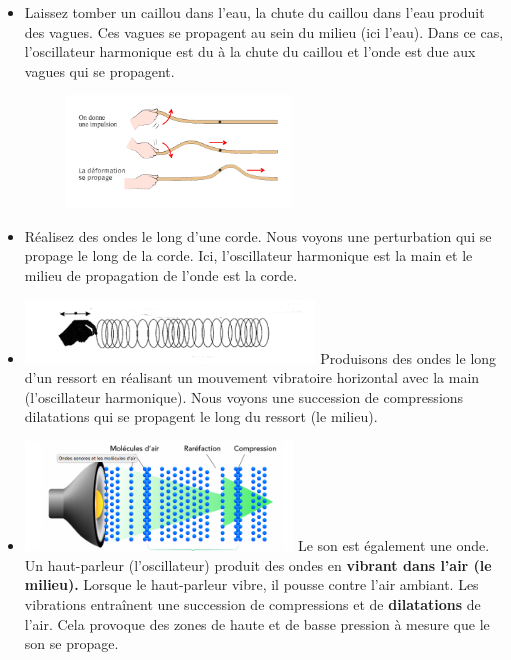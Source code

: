 \begin{multicols}{2}
\begin{itemize}
\item  Laissez tomber un caillou dans l'eau, la chute du caillou dans l'eau
  produit des vagues. Ces vagues se propagent au sein du milieu (ici
  l'eau). Dans ce cas, l'oscillateur harmonique est du à la chute du
  caillou et l'onde est due aux vagues qui se propagent.
   \begin{figure}
   \centering
   \includegraphics[width=6.01cm,height=2.988cm]{Pictures/1000000100000154000000A9940E61F701C2806C.png}
   \caption{}
   \end{figure}
\item   Réalisez des ondes le long d'une corde. Nous voyons une perturbation
  qui se propage le long de la corde. Ici, l'oscillateur harmonique est
  la main et le milieu de propagation de l'onde est la corde.
\item
  \includegraphics[width=7.691cm,height=1.693cm]{Pictures/10000001000001980000005A57BF3FA5614CAA87.png}
  Produisons
  des ondes le long d'un ressort en réalisant un mouvement vibratoire
  horizontal avec la main (l'oscillateur harmonique). Nous voyons une
  succession de compressions dilatations qui se propagent le long du
  ressort (le milieu).
\item  \includegraphics[width=7.103cm,height=2.916cm]{Pictures/100000010000029C00000112A3C2AC0127D5FB85.png}
Le   son est également une onde. Un haut-parleur (l'oscillateur) produit
  des ondes en \textbf{\textbf{vibrant dans l'air (le milieu)}.} Lorsque
  le haut-parleur vibre, il pousse contre l'air ambiant. Les vibrations
  entraînent une succession de compressions et de
  \textbf{\textbf{dilatations} }de l'air. Cela provoque des zones de
  haute et de basse pression à mesure que le son se propage.
\end{itemize}


\end{multicols}
